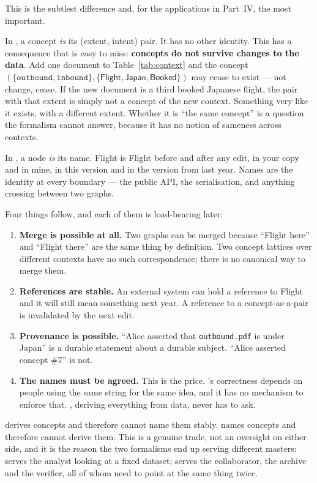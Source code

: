 This is the subtlest difference and, for the applications in Part~IV, the most
important.

In \fca{}, a concept \emph{is} its (extent, intent) pair. It has no other
identity. This has a consequence that is easy to miss: \textbf{concepts do not
survive changes to the data}. Add one document to Table~\ref{tab:context} and
the concept $(\{\texttt{outbound}, \texttt{inbound}\},
\{\textsf{Flight},\textsf{Japan},\textsf{Booked}\})$ may cease to exist ---
not change, cease. If the new document is a third booked Japanese flight, the
pair with that extent is simply not a concept of the new context. Something
very like it exists, with a different extent. Whether it is ``the same
concept'' is a question the formalism cannot answer, because it has no notion
of sameness across contexts.

In \odag{}, a node \emph{is} its name. \textsf{Flight} is \textsf{Flight}
before and after any edit, in your copy and in mine, in this version and in
the version from last year. Names are the identity at every boundary --- the
public API, the serialisation, and anything crossing between two graphs.

Four things follow, and each of them is load-bearing later:

\begin{enumerate}[leftmargin=1.7em]
\item \textbf{Merge is possible at all.} Two graphs can be merged because
  ``\textsf{Flight} here'' and ``\textsf{Flight} there'' are the same thing by
  definition. Two concept lattices over different contexts have no such
  correspondence; there is no canonical way to merge them.
\item \textbf{References are stable.} An external system can hold a reference
  to \textsf{Flight} and it will still mean something next year. A reference
  to a concept-as-a-pair is invalidated by the next edit.
\item \textbf{Provenance is possible.} ``Alice asserted that
  \texttt{outbound.pdf} is under \textsf{Japan}'' is a durable statement about
  a durable subject. ``Alice asserted concept \#7'' is not.
\item \textbf{The names must be agreed.} This is the price. \odag{}'s
  correctness depends on people using the same string for the same idea, and
  it has no mechanism to enforce that. \fca{}, deriving everything from data,
  never has to ask.
\end{enumerate}

\begin{keyidea}
\fca{} derives concepts and therefore cannot name them stably. \odag{} names
concepts and therefore cannot derive them. This is a genuine trade, not an
oversight on either side, and it is the reason the two formalisms end up
serving different masters: \fca{} serves the analyst looking at a fixed
dataset; \odag{} serves the collaborator, the archive and the verifier, all
of whom need to point at the same thing twice.
\end{keyidea}

